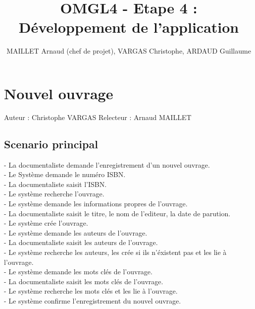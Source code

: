 \documentclass[a4paper,10pt]{report}
\title{OMGL4 - Etape 4 : Développement de l'application}
\author{MAILLET Arnaud (chef de projet), VARGAS Christophe, ARDAUD Guillaume}
\begin{document}
\maketitle
\newpage
\null
\newpage
\tableofcontents
\newpage
\null
\newpage

\centering


\chapter*{Nouvel ouvrage}

Auteur : Christophe VARGAS
Relecteur : Arnaud MAILLET

\bigskip
\section*{Scenario principal}
\begin{flushleft}
- La documentaliste demande l'enregistrement d'un nouvel ouvrage.\\
- Le Système demande le numéro ISBN.\\
- La documentaliste saisit l'ISBN.\\
- Le système recherche l'ouvrage.\\
- Le système demande les informations propres de l'ouvrage.\\
- La documentaliste saisit le titre, le nom de l'editeur, la date de parution.\\
- Le système crée l'ouvrage.\\
- Le système demande les auteurs de l'ouvrage.\\
- La documentaliste saisit les auteurs de l'ouvrage.\\
- Le système recherche les auteurs, les crée si ils n'éxistent pas et les lie à l'ouvrage.\\
- Le système demande les mots clés de l'ouvrage.\\
- La documentaliste saisit les mots clés de l'ouvrage.\\
- Le système recherche les mots clés et les lie à l'ouvrage.\\
- Le système confirme l'enregistrement du nouvel ouvrage.\\
\end{flushleft}
\end{document}
